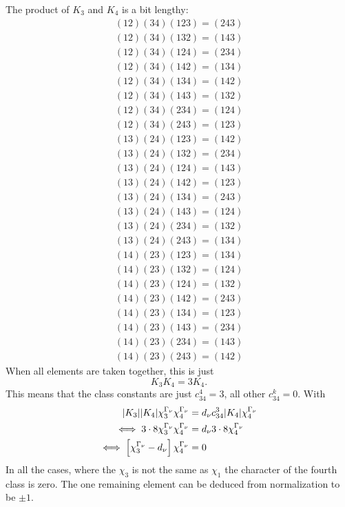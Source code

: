 \documentclass[11pt, english, fleqn, DIV=15, headinclude, BCOR=1cm]{scrartcl}
\begin{document}
The product of $K_3$ and $K_4$ is a bit lengthy:
\begin{gather*}
    (12)(34) (123) = (243) \\
    (12)(34) (132) = (143) \\
    (12)(34) (124) = (234) \\
    (12)(34) (142) = (134) \\
    (12)(34) (134) = (142) \\
    (12)(34) (143) = (132) \\
    (12)(34) (234) = (124) \\
    (12)(34) (243) = (123) \\
    (13)(24) (123) = (142) \\
    (13)(24) (132) = (234) \\
    (13)(24) (124) = (143) \\
    (13)(24) (142) = (123) \\
    (13)(24) (134) = (243) \\
    (13)(24) (143) = (124) \\
    (13)(24) (234) = (132) \\
    (13)(24) (243) = (134) \\
    (14)(23) (123) = (134) \\
    (14)(23) (132) = (124) \\
    (14)(23) (124) = (132) \\
    (14)(23) (142) = (243) \\
    (14)(23) (134) = (123) \\
    (14)(23) (143) = (234) \\
    (14)(23) (234) = (143) \\
    (14)(23) (243) = (142)
\end{gather*}
When all elements are taken together, this is just
\[
    K_3 K_4 = 3 K_4.
\]
This means that the class constants are just $c_{34}^4 = 3$, all other
$c_{34}^k = 0$. With
\begin{align*}
    |K_3| |K_4| \chi^{\Gamma_\nu}_3 \chi^{\Gamma_\nu}_4 &= d_\nu c_{34}^3
    |K_4| \chi^{\Gamma_\nu}_4 \\
    \iff 3 \cdot 8 \chi^{\Gamma_\nu}_3 \chi^{\Gamma_\nu}_4 &= d_\nu 3 \cdot 8
    \chi^{\Gamma_\nu}_4 \\
    \iff \left[ \chi^{\Gamma_\nu}_3 - d_\nu \right] \chi^{\Gamma_\nu}_4 &= 0 \\
\end{align*}
In all the cases, where the $\chi_3$ is not the same as $\chi_1$ the character
of the fourth class is zero. The one remaining element can be deduced from
normalization to be $\pm 1$.
\end{document}
